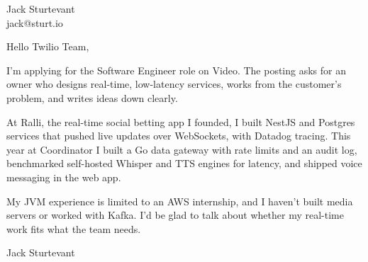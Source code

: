 \documentclass[11pt]{article}
\begin{document}
\raggedright

{\namefont\fontsize{20pt}{24pt}\selectfont Jack Sturtevant}\\[-0.3em]
jack@sturt.io

\vspace{1.2em}

Hello Twilio Team,

I'm applying for the Software Engineer role on Video. The posting asks for an owner who designs real-time, low-latency services, works from the customer's problem, and writes ideas down clearly.

At Ralli, the real-time social betting app I founded, I built NestJS and Postgres services that pushed live updates over WebSockets, with Datadog tracing. This year at Coordinator I built a Go data gateway with rate limits and an audit log, benchmarked self-hosted Whisper and TTS engines for latency, and shipped voice messaging in the web app.

My JVM experience is limited to an AWS internship, and I haven't built media servers or worked with Kafka. I'd be glad to talk about whether my real-time work fits what the team needs.

\vspace{0.6em}
Jack Sturtevant
\end{document}
